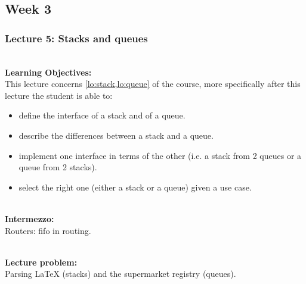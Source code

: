 \subsection{Week 3}
\label{sub:week_3}

\subsubsection{Lecture 5: Stacks and queues}
\label{sub:lecture_5}

\hfill\\
\textbf{Learning Objectives:}\\
This lecture concerns \cref{lo:stack,lo:queue} of the course, more specifically after this lecture the student is able
to:
\begin{itemize}
	\item define the interface of a stack and of a queue.
	\item describe the differences between a stack and a queue.
	\item implement one interface in terms of the other (i.e. a stack from 2 queues or a queue from 2 stacks).
	\item select the right one (either a stack or a queue) given a use case.
\end{itemize}

\hfill\\
\textbf{Intermezzo:}\\
Routers: fifo in routing.

\hfill\\
\textbf{Lecture problem:}\\
Parsing LaTeX (stacks) and the supermarket registry (queues).

